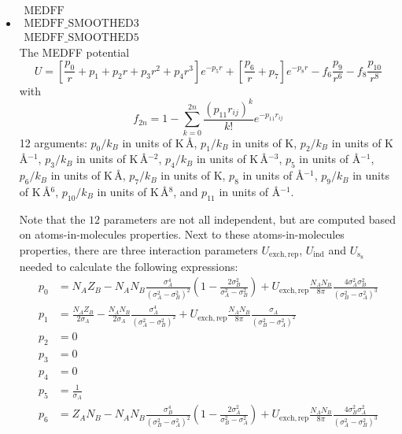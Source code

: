 \begin{itemize}
\item{$\begin{array}{l}\text{MEDFF}\\
      \text{MEDFF\_SMOOTHED3}\\
      \text{MEDFF\_SMOOTHED5}\end{array}$}\\
The MEDFF potential \cite{Vandenbrande2016}
  \begin{equation}
    U= \left[ \frac{p_0}{r} + p_1 + p_2r + p_3r^2 +p_4 r^3 \right] e^{-p_5r} + \left[ \frac{p_6}{r} + p_7 \right] e^{-p_8r} - f_6\frac{p_9}{r^6} - f_8\frac{p_{10}}{r^8}
  \end{equation}
  with
  \begin{equation}
   f_{2n}=1-\sum_{k=0}^{2n}\frac{\left(p_{11} r_{ij}\right)^k}{k!} e^{-p_{11} r_{ij}}
  \end{equation}
  12 arguments: $p_0/k_B$ in units of K\,\AA, $p_1/k_B$ in units of K, $p_2/k_B$ in units of K\,\AA$^{-1}$,
    $p_3/k_B$ in units of K\,\AA$^{-2}$, $p_4/k_B$ in units of K\,\AA$^{-3}$, $p_{5}$ in units of \AA$^{-1}$,
    $p_6/k_B$ in units of K\,\AA, $p_7/k_B$ in units of K, $p_{8}$ in units of \AA$^{-1}$,
    $p_9/k_B$ in units of K\,\AA$^{6}$, $p_{10}/k_B$ in units of K\,\AA$^{8}$, and $p_{11}$ in units of \AA$^{-1}$.
\par Note that the $12$ parameters are not all independent, but are computed based on atoms-in-molecules properties. Next to these atoms-in-molecules properties, there are three interaction parameters $U_{\mathrm{exch,rep}}$, $U_{\mathrm{ind}}$ and $U_{\mathrm{s_8}}$ needed to calculate the following expressions:
  \begin{align}
    p_0 &= N_AZ_B-N_AN_B\frac{\sigma_{A}^4}{(\sigma_{A}^2-\sigma_{B}^2)^2}\left( 1 - \frac{2\sigma_{B}^2}{\sigma_{A}^2-\sigma_{B}^2} \right)  +  U_{\mathrm{exch,rep}}\frac{N_AN_B}{8\pi} \frac{4\sigma_{A}^2\sigma_{B}^2}{(\sigma_{B}^2-\sigma_{A}^2)^3}\\
    p_1 &= \frac{N_AZ_B}{2\sigma_{A}} - \frac{N_AN_B}{2\sigma_{A}}\frac{\sigma_{A}^4}{(\sigma_{A}^2-\sigma_{B}^2)^2} +  U_{\mathrm{exch,rep}}\frac{N_AN_B}{8\pi} \frac{\sigma_{A}}{(\sigma_{B}^2-\sigma_{A}^2)^2}\\
    p_2 &= 0 \\
    p_3 &= 0 \\
    p_4 &= 0 \\
    p_5 &= \frac{1}{\sigma_{A}} \\
    p_6 &= Z_AN_B-N_AN_B\frac{\sigma_{B}^4}{(\sigma_{B}^2-\sigma_{A}^2)^2}\left( 1 - \frac{2\sigma_{A}^2}{\sigma_{B}^2-\sigma_{A}^2} \right)  +  U_{\mathrm{exch,rep}}\frac{N_AN_B}{8\pi} \frac{4\sigma_{B}^2\sigma_{A}^2}{(\sigma_{A}^2-\sigma_{B}^2)^3}\\

\end{align}
\end{itemize}
